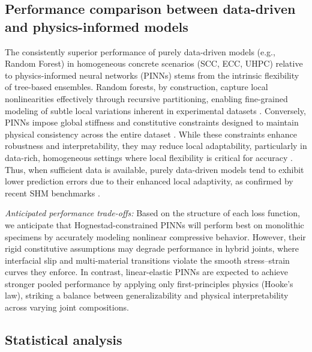 \documentclass{article}
\begin{document}
\subsection{Performance comparison between data-driven and physics-informed models}
\label{sec:performance_comparison_method}

The consistently superior performance of purely data-driven models (e.g., Random Forest) in homogeneous concrete scenarios (SCC, ECC, UHPC) relative to physics-informed neural networks (PINNs) stems from the intrinsic flexibility of tree-based ensembles. Random forests, by construction, capture local nonlinearities effectively through recursive partitioning, enabling fine-grained modeling of subtle local variations inherent in experimental datasets \cite{breiman2001random}. Conversely, PINNs impose global stiffness and constitutive constraints designed to maintain physical consistency across the entire dataset \cite{raissi2019physics}. While these constraints enhance robustness and interpretability, they may reduce local adaptability, particularly in data-rich, homogeneous settings where local flexibility is critical for accuracy \cite{karniadakis2021}. Thus, when sufficient data is available, purely data-driven models tend to exhibit lower prediction errors due to their enhanced local adaptivity, as confirmed by recent SHM benchmarks \cite{fan2023pinn,Chen2024HybridML}.

\emph{Anticipated performance trade-offs:} 
Based on the structure of each loss function, we anticipate that Hognestad-constrained PINNs will perform best on monolithic specimens by accurately modeling nonlinear compressive behavior. However, their rigid constitutive assumptions may degrade performance in hybrid joints, where interfacial slip and multi-material transitions violate the smooth stress–strain curves they enforce. In contrast, linear-elastic PINNs are expected to achieve stronger pooled performance by applying only first-principles physics (Hooke’s law), striking a balance between generalizability and physical interpretability across varying joint compositions.



\subsection{Statistical analysis}
\label{subsec:stats_results}
\end{document}
